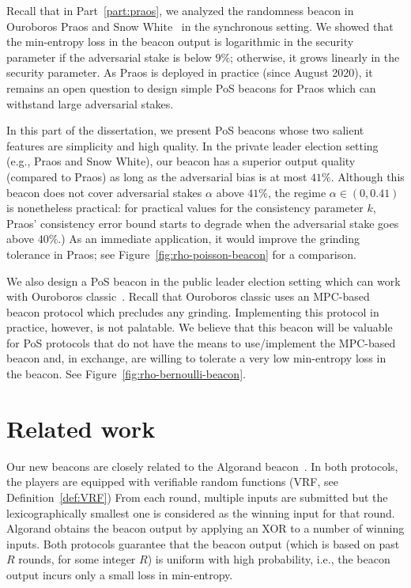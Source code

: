 
Recall that in Part~\ref{part:praos}, 
we analyzed the randomness beacon in Ouroboros Praos\cite{Praos} and Snow White~\cite{SnowWhite} 
in the synchronous setting. 
We showed 
that the min-entropy loss in the beacon output 
is logarithmic in the security parameter if the adversarial stake is below $9\%$; 
otherwise, it grows linearly in the security parameter.
As Praos is deployed in practice (since August 2020), 
it remains an open question to design simple PoS beacons for Praos 
which can withstand large adversarial stakes.

In this part of the dissertation, 
we present PoS beacons 
whose two salient features are simplicity and high quality.
In the private leader election setting (e.g., Praos and Snow White), 
our beacon has a superior output quality 
(compared to Praos) 
as long as the adversarial bias is at most $41\%$. 
Although this beacon does not cover adversarial stakes $\alpha$ above $41\%$, 
the regime $\alpha \in (0, 0.41)$ is nonetheless practical: 
for practical values for the consistency parameter $k$, 
Praos' consistency error bound 
starts to degrade when the adversarial stake goes above $40\%$.) 
As an immediate application, it would improve the grinding tolerance in Praos; 
see Figure~\ref{fig:rho-poisson-beacon} for a comparison.




We also design a PoS beacon in the public leader election setting 
which can work with Ouroboros classic~\cite{Ouroboros}. 
Recall that Ouroboros classic uses an MPC-based beacon protocol 
which precludes any grinding. 
Implementing this protocol in practice, however, is not palatable. 
We believe that this beacon will be valuable for 
PoS protocols 
that do not have the means to use/implement the MPC-based beacon 
and, in exchange, are willing to tolerate a very low min-entropy loss 
in the beacon. 
See Figure~\ref{fig:rho-bernoulli-beacon}.


\section{Related work}
Our new beacons are closely related to the Algorand beacon~\cite{Algorand}. 
In both protocols, 
the players are equipped with verifiable
random functions (VRF, see Definition~\ref{def:VRF}) 
From each round, multiple inputs are submitted 
but the lexicographically smallest one is considered as the winning input for that round.
Algorand obtains the beacon output by applying an XOR to a number of winning inputs. 
Both protocols guarantee that the beacon output (which is based on past $R$ rounds, for some integer $R$) 
is uniform with high probability, i.e., 
the beacon output incurs only a small loss in min-entropy. 

